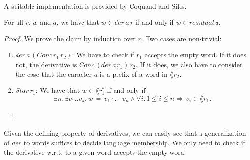 \documentclass[11pt,a4paper,oneside]{book}
\begin{document}
                    \paragraph{}
                        A suitable implementation is provided by Coquand and Siles.



                    \begin{theorem}
                        \label{der_correct}
                        For all $r$, $w$ and $a$, we have that $w \in der \, a \, r$ if and only if $w \in residual \, a $.
                    \end{theorem}

                    \begin{proof}
                        We prove the claim by induction over $r$. Two cases are non-trivial: 
                        \begin{enumerate}
                            \item
                                $der \, a \, (Conc \, r_1 \, r_2)$: 
                                We have to check if $r_1$ accepts the empty word. 
                                If it does not, the derivative is $Conc \, (der \, a \, r_1) \, r_2$.
                                If it does, we also have to consider the case that the caracter $a$ is a prefix of a word in $\lang{r_2}$.
                            \item
                                $Star \, r_1$: 
                                We have that $w \in \lang{r_1^*}$ if and only if 
                                \[
                                    \, \exists n. \, \exists v_1 .. v_n. \, w \, = \, v_1 \cdot .. \cdot v_n 
                                    \wedge \forall i. \, 1 \leq i \leq n 
                                    \Rightarrow
                                    \, v_i \in \lang{r_1}.
                                \]
                        \end{enumerate}
                    \end{proof}

                \paragraph{} 
                    Given the defining property of derivatives, we can easily see that a generalization of $der$ to words suffices to decide language membership. We only need to check if the derivative w.r.t. to a given word accepts the empty word.
\end{document}
